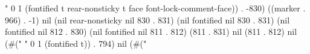 " 0 1 (fontified t rear-nonsticky t face font-lock-comment-face)) . -830) ((marker . 966) . -1) nil (nil rear-nonsticky nil 830 . 831) (nil fontified nil 830 . 831) (nil fontified nil 812 . 830) (nil fontified nil 811 . 812) (811 . 831) nil (811 . 812) nil (#("
" 0 1 (fontified t)) . 794) nil (#("%